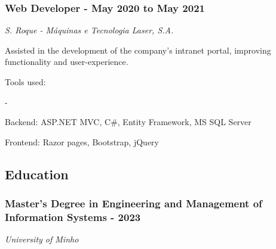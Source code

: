 \documentclass[a4paper,11pt]{article}
\renewenvironment{itemize}{
  \begin{list}
    {-}
    {
      \setlength{\leftmargin}{1em}
      \setlength{\itemsep}{-0.3em}
      \setlength{\parskip}{0em}
      \setlength{\parsep}{0em}
    }
}{
  \end{list}
}
\begin{document}
    \subsubsection{Web Developer - May 2020 to May
    2021}\label{web-developer---may-2020-to-may-2021}

    \emph{S. Roque - Máquinas e Tecnologia Laser, S.A.}

    Assisted in the development of the company's intranet portal,
    improving functionality and user-experience.

    Tools used:

    \begin{itemize}
    \item
      Backend: ASP.NET MVC, C\#, Entity Framework, MS SQL Server
    \item
      Frontend: Razor pages, Bootstrap, jQuery
    \end{itemize}

    \subsection{Education}\label{education}

    \subsubsection{Master's Degree in Engineering and Management of
    Information Systems -
    2023}\label{masters-degree-in-engineering-and-management-of-information-systems---2023}

    \emph{University of Minho}
\end{document}
